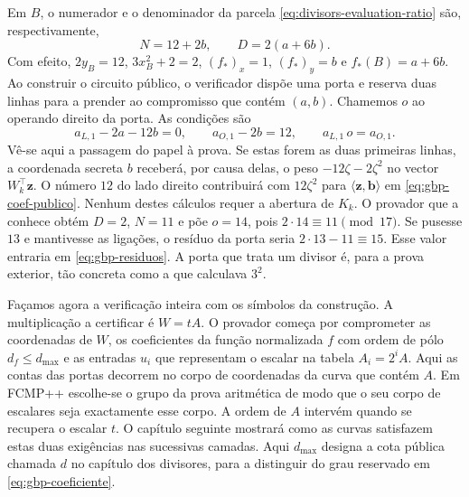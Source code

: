 Em \(B\), o numerador e o denominador da parcela
\eqref{eq:divisors-evaluation-ratio} são, respectivamente,
\[
 N=12+2b,\qquad D=2(a+6b).
\]
Com efeito, \(2y_B=12\), \(3x_B^2+2=2\),
\((f_*)_x=1\), \((f_*)_y=b\) e \(f_*(B)=a+6b\).
Ao construir o circuito público, o verificador dispõe uma porta e
reserva duas linhas para a prender ao compromisso que contém \((a,b)\).
Chamemos \(o\) ao operando direito da porta. As condições são
\begin{equation}
 a_{L,1}-2a-12b=0,\qquad a_{O,1}-2b=12,\qquad
 a_{L,1}\,o=a_{O,1}.
 \label{eq:gbp-porta-divisor}
\end{equation}
Vê-se aqui a passagem do papel à prova. Se estas forem as duas primeiras
linhas, a coordenada secreta \(b\) receberá, por causa delas, o peso
\(-12\zeta-2\zeta^2\) no vector \(W_k^\top\boldsymbol z\).
O número \(12\) do lado direito contribuirá com \(12\zeta^2\) para
\(\langle\boldsymbol z,\boldsymbol b\rangle\) em
\eqref{eq:gbp-coef-publico}. Nenhum destes cálculos requer a abertura
de \(K_k\). O provador que a conhece obtém \(D=2\), \(N=11\) e
põe \(o=14\), pois \(2\cdot14\equiv11\pmod{17}\).
Se pusesse \(13\) e mantivesse as ligações, o resíduo da porta seria
\(2\cdot13-11\equiv15\). Esse valor entraria em
\eqref{eq:gbp-residuos}. A porta que trata um divisor é, para a prova
exterior, tão concreta como a que calculava \(3^2\).

Façamos agora a verificação inteira com os símbolos da construção.
A multiplicação a certificar é \(W=tA\). O provador começa por
comprometer as coordenadas de \(W\), os coeficientes da função
normalizada \(f\) com ordem de pólo \(d_f\leq d_{\max}\) e as entradas
\(u_i\) que representam o escalar na tabela \(A_i=2^i A\).
Aqui as contas das portas decorrem no corpo de coordenadas da curva
que contém \(A\). Em FCMP++ escolhe-se o grupo da prova aritmética
de modo que o seu corpo de escalares seja exactamente esse corpo.
A ordem de \(A\) intervém quando se recupera o escalar \(t\).
O capítulo seguinte mostrará como as curvas satisfazem estas duas
exigências nas sucessivas camadas.
Aqui \(d_{\max}\) designa a cota pública chamada \(d\) no
capítulo dos divisores, para a distinguir do grau reservado em
\eqref{eq:gbp-coeficiente}.

